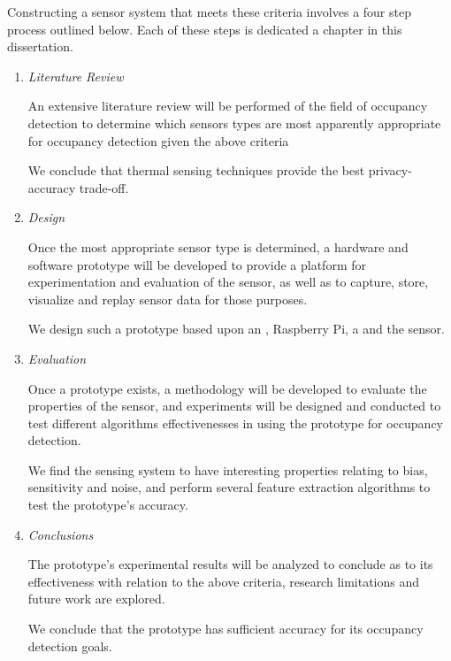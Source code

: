 \documentclass[../thesis/thesis.tex]{subfiles}
\begin{document}
Constructing a sensor system that meets these criteria involves a four step process outlined below. Each of these steps is dedicated a chapter in this dissertation.
\begin{enumerate}
\item \emph{Literature Review}

An extensive literature review will be performed of the field of occupancy detection to determine which sensors types are most apparently appropriate for occupancy detection given the above criteria

We conclude that thermal sensing techniques provide the best privacy-accuracy trade-off.

\item \emph{Design}

Once the most appropriate sensor type is determined, a hardware and software prototype will be developed to provide a platform for experimentation and evaluation of the sensor, as well as to capture, store, visualize and replay sensor data for those purposes.

We design such a prototype based upon an \ard, Raspberry Pi, a \pir and the \mlx sensor.

\item \emph{Evaluation}

Once a prototype exists, a methodology will be developed to evaluate the properties of the sensor, and experiments will be designed and conducted to test different algorithms effectivenesses in using the prototype for occupancy detection.

We find the sensing system to have interesting properties relating to bias, sensitivity and noise, and perform several feature extraction algorithms to test the prototype's accuracy.

\item \emph{Conclusions}

The prototype's experimental results will be analyzed to conclude as to its effectiveness with relation to the above criteria, research limitations and future work are explored.

We conclude that the prototype has sufficient accuracy for its occupancy detection goals.
\end{enumerate}

 
\end{document}
